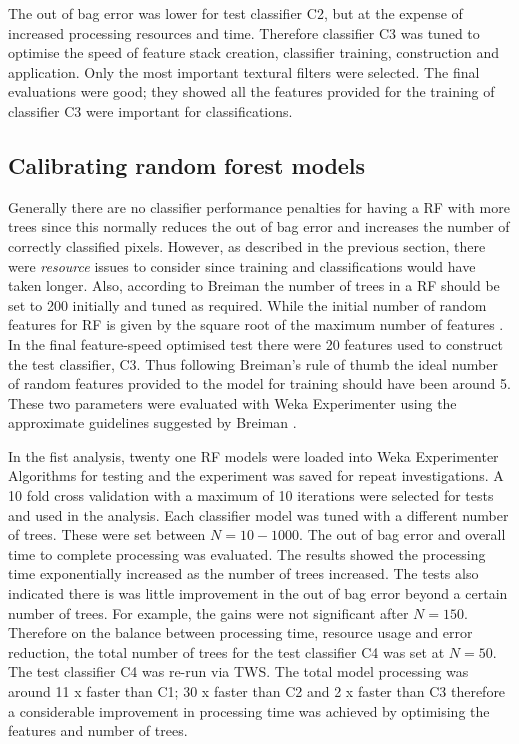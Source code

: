 The out of bag error was lower for test classifier C2, but at the expense of increased processing resources and time. Therefore classifier C3 was tuned to optimise the speed of feature stack creation, classifier training, construction and application. Only the most important textural filters were selected. The final evaluations were good; they showed all the features provided for the training of classifier C3 were important for classifications.

\subsection{Calibrating random forest models}\label{sec:calibrating-random-forest-models}
Generally there are no classifier performance penalties for having a \ac{RF} with more trees since this normally reduces the out of bag error and increases the number of correctly classified pixels. However, as described in the previous section, there were \emph{resource} issues to consider since training and classifications would have taken longer. Also, according to Breiman \cite{Breiman2001} the number of trees in a \ac{RF} should be set to 200 initially and tuned as required. While the initial number of random features for \ac{RF} is given by the square root of the maximum number of features \cite{Breiman2001}. In the final feature-speed optimised test there were 20 features used to construct the test classifier, C3. Thus following Breiman's \cite{Breiman2001} rule of thumb the ideal number of random features provided to the model for training should have been around 5. These two parameters were evaluated with Weka Experimenter using the approximate guidelines suggested by Breiman \cite{Breiman2001}.

In the fist analysis, twenty one \ac{RF} models were loaded into Weka Experimenter {Algorithms} for testing and the experiment was saved for repeat investigations. A 10 fold cross validation with a maximum of 10 iterations were selected for tests and used in the analysis. Each classifier model was tuned with a different number of trees. These were set between $ N=10 - 1000 $. The out of bag error and overall time to complete processing was evaluated. The results showed the processing time exponentially increased as the number of trees increased. The tests also indicated there is was little improvement in the out of bag error beyond a certain number of trees. For example, the gains were not significant after $N = 150$. Therefore on the balance between processing time, resource usage and error reduction, the total number of trees for the test classifier C4 was set at $N = 50$. The test classifier C4 was re-run via \ac{TWS}. The total model processing was around 11 x faster than C1; 30 x faster than C2 and 2 x faster than C3 therefore a considerable improvement in processing time was achieved by optimising the features and number of trees.

